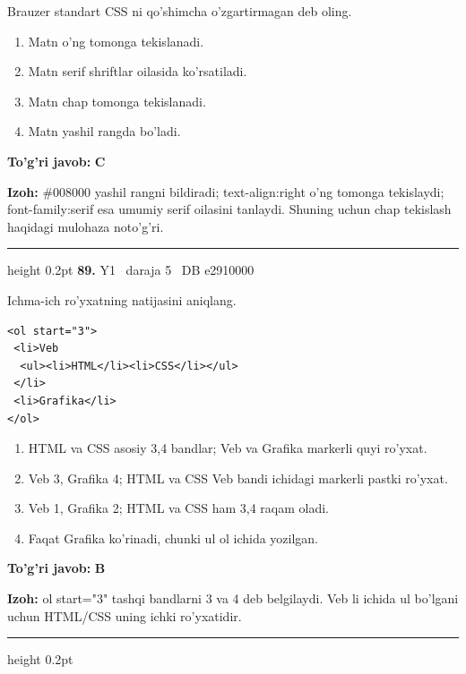 \documentclass[10pt,a4paper,oneside]{article}
\begin{document}
\par
Brauzer standart CSS ni qo'shimcha o'zgartirmagan deb oling.
\begin{enumerate}[label=\Alph*),leftmargin=9mm]
\item Matn o'ng tomonga tekislanadi.
\item Matn serif shriftlar oilasida ko'rsatiladi.
\item Matn chap tomonga tekislanadi.
\item Matn yashil rangda bo'ladi.
\end{enumerate}
\begin{tcolorbox}[enhanced,breakable,colback=teal!4,colframe=teal!45!black,boxrule=0.45pt,arc=1.2mm,left=2.8mm,right=2.8mm,top=2mm,bottom=2mm,before skip=2mm,after skip=2mm]
\textbf{\color{teal}To'g'ri javob:} \textbf{C}
\par\smallskip
\textbf{Izoh:} \#008000 yashil rangni bildiradi; text-align:right o'ng tomonga tekislaydi; font-family:serif esa umumiy serif oilasini tanlaydi. Shuning uchun chap tekislash haqidagi mulohaza noto'g'ri.
\end{tcolorbox}
\vspace{2mm}\hrule height 0.2pt \vspace{4mm}
\hypertarget{q89}{\textbf{\color{ink}89.}}  {\color{muted}\scriptsize Y1 \textbullet\ daraja 5 \textbullet\ DB e2910000}
\par
Ichma-ich ro'yxatning natijasini aniqlang.\par
\begin{lstlisting}
<ol start="3">
 <li>Veb
  <ul><li>HTML</li><li>CSS</li></ul>
 </li>
 <li>Grafika</li>
</ol>
\end{lstlisting}

\begin{enumerate}[label=\Alph*),leftmargin=9mm]
\item HTML va CSS asosiy 3,4 bandlar; Veb va Grafika markerli quyi ro'yxat.
\item Veb 3, Grafika 4; HTML va CSS Veb bandi ichidagi markerli pastki ro'yxat.
\item Veb 1, Grafika 2; HTML va CSS ham 3,4 raqam oladi.
\item Faqat Grafika ko'rinadi, chunki ul ol ichida yozilgan.
\end{enumerate}
\begin{tcolorbox}[enhanced,breakable,colback=teal!4,colframe=teal!45!black,boxrule=0.45pt,arc=1.2mm,left=2.8mm,right=2.8mm,top=2mm,bottom=2mm,before skip=2mm,after skip=2mm]
\textbf{\color{teal}To'g'ri javob:} \textbf{B}
\par\smallskip
\textbf{Izoh:} ol start="3" tashqi bandlarni 3 va 4 deb belgilaydi. Veb li ichida ul bo'lgani uchun HTML/CSS uning ichki ro'yxatidir.
\end{tcolorbox}
\vspace{2mm}\hrule height 0.2pt \vspace{4mm}
\end{document}
